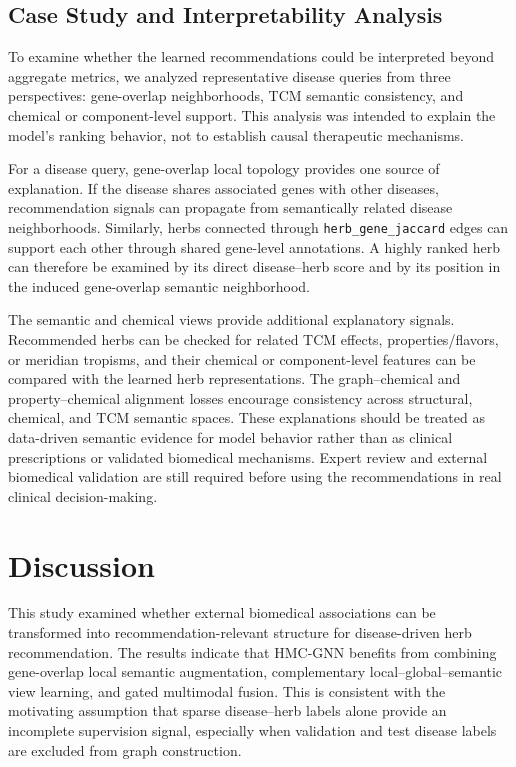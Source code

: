 \documentclass[journal,twoside,web]{ieeecolor}
\begin{document}
\subsection{Case Study and Interpretability Analysis}
\label{subsec:case_study}

To examine whether the learned recommendations could be interpreted beyond aggregate metrics, we analyzed representative disease queries from three perspectives: gene-overlap neighborhoods, TCM semantic consistency, and chemical or component-level support. This analysis was intended to explain the model's ranking behavior, not to establish causal therapeutic mechanisms.

For a disease query, gene-overlap local topology provides one source of explanation. If the disease shares associated genes with other diseases, recommendation signals can propagate from semantically related disease neighborhoods. Similarly, herbs connected through \texttt{herb\_gene\_jaccard} edges can support each other through shared gene-level annotations. A highly ranked herb can therefore be examined by its direct disease--herb score and by its position in the induced gene-overlap semantic neighborhood.

The semantic and chemical views provide additional explanatory signals. Recommended herbs can be checked for related TCM effects, properties/flavors, or meridian tropisms, and their chemical or component-level features can be compared with the learned herb representations. The graph--chemical and property--chemical alignment losses encourage consistency across structural, chemical, and TCM semantic spaces. These explanations should be treated as data-driven semantic evidence for model behavior rather than as clinical prescriptions or validated biomedical mechanisms. Expert review and external biomedical validation are still required before using the recommendations in real clinical decision-making.

\section{Discussion}
\label{sec:discussion}

This study examined whether external biomedical associations can be transformed into recommendation-relevant structure for disease-driven herb recommendation. The results indicate that HMC-GNN benefits from combining gene-overlap local semantic augmentation, complementary local--global--semantic view learning, and gated multimodal fusion. This is consistent with the motivating assumption that sparse disease--herb labels alone provide an incomplete supervision signal, especially when validation and test disease labels are excluded from graph construction.
\end{document}
